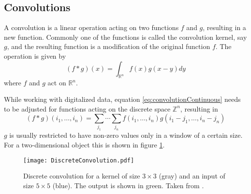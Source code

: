 \subsection{Convolutions}
A convolution is a linear operation acting on two functions $f$ and $g$, resulting in a new function. Commonly one of the functions is called the convolution kernel, say $g$, and the resulting function is a modification of the original function $f$. The operation is given by
\begin{equation} \label{eq:convolutionContinuous}
(f*g)(x) = \int_{\mathbb{R}^n} f(x)g(x-y)dy
\end{equation}
where $f$ and $g$ act on $\mathbb{R}^n$. 

While working with digitalized data, equation \ref{eq:convolutionContinuous} needs to be adjusted for functions acting on the discrete space $\mathbb{Z}^n$, resulting in
\begin{equation}\label{eq:convolutionDiscrete}
(f*g)(i_1,\dots ,i_n) = \sum_{j_1} \cdots \sum_{j_n} f(i_1,\dots ,i_n) g(i_1-j_1,\dots ,i_n-j_n)
\end{equation}
$g$ is usually restricted to have non-zero values only in a window of a certain size. For a two-dimensional object this is shown in figure \ref{fig:Convolution}. \\

\begin{figure}[H]
\centering
\texttt{[image: DiscreteConvolution.pdf]}
\caption{Discrete convolution for a kernel of size $3\times 3$ (gray) and an input of size $5\times 5$ (blue). The output is shown in green. Taken from \cite{RajaKishor2016}.}
\label{fig:Convolution}
\end{figure}

